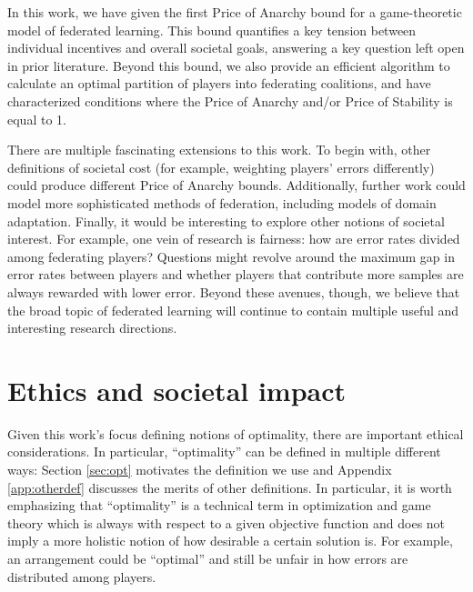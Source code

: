 \documentclass{article}
\begin{document}
In this work, we have given the first Price of Anarchy bound for a game-theoretic model of federated learning.  This bound quantifies a key tension between individual incentives and overall societal goals, answering a key question left open in prior literature. Beyond this bound, we also provide an efficient algorithm to calculate an optimal partition of players into federating coalitions, and have characterized conditions where the Price of Anarchy and/or Price of Stability is equal to 1. 

There are multiple fascinating extensions to this work. To begin with, other definitions of societal cost (for example, weighting players' errors differently) could produce different Price of Anarchy bounds. Additionally, further work could model more sophisticated methods of federation, including models of domain adaptation. Finally, it would be interesting to explore other notions of societal interest. For example, one vein of research is fairness: how are error rates divided among federating players? Questions might revolve around the maximum gap in error rates between players and whether players that contribute more samples are always rewarded with lower error. Beyond these avenues, though, we believe that the broad topic of federated learning will continue to contain multiple useful and interesting research directions. 

\section{Ethics and societal impact}\label{sec:ethics}
Given this work's focus defining notions of optimality, there are important ethical considerations. In particular, \enquote{optimality} can be defined in multiple different ways: Section \ref{sec:opt} motivates the definition we use and Appendix \ref{app:otherdef} discusses the merits of other definitions. In particular, it is worth emphasizing that \enquote{optimality} is a technical term in optimization and game theory which is always with respect to a given objective function and does not imply a more holistic notion of how desirable a certain solution is. For example, an arrangement could be \enquote{optimal} and still be unfair in how errors are distributed among players. 

\end{document}
